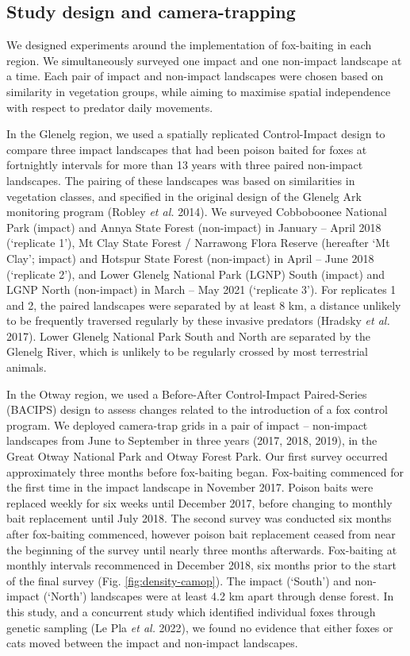 \documentclass[preprint, 3p, authoryear]{elsarticle} %
\begin{document}
\hypertarget{study-design-and-camera-trapping}{%
\subsection{Study design and camera-trapping}\label{study-design-and-camera-trapping}}

We designed experiments around the implementation of fox-baiting in each region. We simultaneously surveyed one impact and one non-impact landscape at a time. Each pair of impact and non-impact landscapes were chosen based on similarity in vegetation groups, while aiming to maximise spatial independence with respect to predator daily movements.

In the Glenelg region, we used a spatially replicated Control-Impact design to compare three impact landscapes that had been poison baited for foxes at fortnightly intervals for more than 13 years with three paired non-impact landscapes. The pairing of these landscapes was based on similarities in vegetation classes, and specified in the original design of the Glenelg Ark monitoring program (Robley \emph{et al.} 2014). We surveyed Cobboboonee National Park (impact) and Annya State Forest (non-impact) in January -- April 2018 (`replicate 1'), Mt Clay State Forest / Narrawong Flora Reserve (hereafter `Mt Clay'; impact) and Hotspur State Forest (non-impact) in April -- June 2018 (`replicate 2'), and Lower Glenelg National Park (LGNP) South (impact) and LGNP North (non-impact) in March -- May 2021 (`replicate 3'). For replicates 1 and 2, the paired landscapes were separated by at least 8 km, a distance unlikely to be frequently traversed regularly by these invasive predators (Hradsky \emph{et al.} 2017). Lower Glenelg National Park South and North are separated by the Glenelg River, which is unlikely to be regularly crossed by most terrestrial animals.

In the Otway region, we used a Before-After Control-Impact Paired-Series (BACIPS) design to assess changes related to the introduction of a fox control program. We deployed camera-trap grids in a pair of impact -- non-impact landscapes from June to September in three years (2017, 2018, 2019), in the Great Otway National Park and Otway Forest Park. Our first survey occurred approximately three months before fox-baiting began. Fox-baiting commenced for the first time in the impact landscape in November 2017. Poison baits were replaced weekly for six weeks until December 2017, before changing to monthly bait replacement until July 2018. The second survey was conducted six months after fox-baiting commenced, however poison bait replacement ceased from near the beginning of the survey until nearly three months afterwards. Fox-baiting at monthly intervals recommenced in December 2018, six months prior to the start of the final survey (Fig. \ref{fig:density-camop}). The impact (`South') and non-impact (`North') landscapes were at least 4.2 km apart through dense forest. In this study, and a concurrent study which identified individual foxes through genetic sampling (Le Pla \emph{et al.} 2022), we found no evidence that either foxes or cats moved between the impact and non-impact landscapes.
\end{document}
